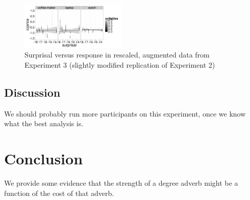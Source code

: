 \documentclass[10pt,letterpaper]{article}
\begin{document}
    \begin{figure}[ht]
    \begin{center}
    \includegraphics[width=0.45\textwidth]{exp3-deintensifiers-zz.png}
    \end{center}
    \caption{Surprisal versus response in rescaled, augmented data from Experiment 3 (slightly modified replication of Experiment 2)} 
    \label{exp3-deintensifiers}
    \end{figure}
  
  \subsection{Discussion}
  
  We should probably run more participants on this experiment, once we know what the best analysis is.
  
  \section{Conclusion}
  
  We provide some evidence that the strength of a degree adverb might be a function of the cost of that adverb.

\nocite{web1t5gram}
\nocite{lewis}



\setlength{\bibleftmargin}{.125in}
\setlength{\bibindent}{-\bibleftmargin}


\end{document}
